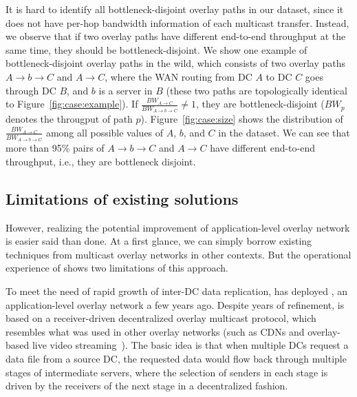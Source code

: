 It is hard to identify all bottleneck-disjoint overlay paths in our
dataset, since it does not have per-hop bandwidth information of each
multicast transfer.
Instead, we observe that if two overlay paths have different end-to-end 
throughput at the same time, they should be bottleneck-disjoint.
We show one example of bottleneck-disjoint overlay paths in the wild, 
which consists of two overlay paths $A$$\rightarrow$$b$$\rightarrow$$C$ 
and $A$$\rightarrow$$C$, where the WAN routing from DC $A$ to DC $C$ goes
through DC $B$, and $b$ is a server in $B$ (these two paths are 
topologically identical to Figure~\ref{fig:case:example}).
If $\frac{BW_{A\rightarrow C}}{BW_{A\rightarrow b\rightarrow C}}\neq1$,
they are bottleneck-disjoint ($BW_p$ denotes the througput of path $p$).
Figure~\ref{fig:case:size} shows the distribution of
$\frac{BW_{A\rightarrow C}}{BW_{A\rightarrow b\rightarrow C}}$
among all possible values of $A$, $b$, and $C$ in the dataset.
We can see that more than 95\% pairs of $A$$\rightarrow$$b$$\rightarrow$$C$ 
and $A$$\rightarrow$$C$ have different end-to-end throughput, i.e., 
they are bottleneck disjoint.


\subsection{Limitations of existing solutions}
\label{subsec:motivation:baseline}

However, realizing the potential improvement of application-level 
overlay network is easier said than done. At a first glance, we can 
simply borrow existing techniques from multicast overlay networks 
in other contexts. But the operational experience of \company shows
two limitations of this approach.

To meet the need of rapid growth of inter-DC data replication, 
\company has deployed \alg, an application-level overlay network a few 
years ago. Despite years of refinement, \alg is based on a 
receiver-driven decentralized overlay multicast protocol, which
resembles what was used in other overlay networks (such as CDNs and 
overlay-based live video 
streaming~\cite{Andreev2013Designing,sripanidkulchai2004analysis,zhang2005coolstreaming}).
The basic idea is that when multiple DCs request a data file from 
a source DC, the requested data would flow back through multiple 
stages of intermediate servers,  where the selection of senders in 
each stage is driven by the receivers of the next stage in a 
decentralized fashion.

